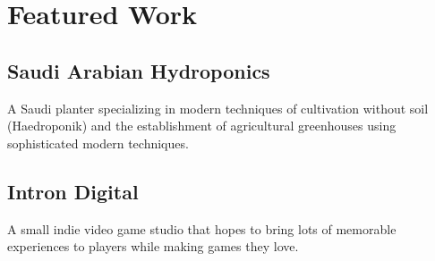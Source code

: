 \section*{Featured Work}
%
%
%
\subsection*{
	Saudi Arabian Hydroponics
}
A Saudi planter specializing in modern techniques of cultivation without soil (Haedroponik) and the establishment of agricultural greenhouses using sophisticated modern techniques.
%
%
\subsection*{
	Intron Digital
}
A small indie video game studio that hopes to bring lots of memorable experiences to players while making games they love.
